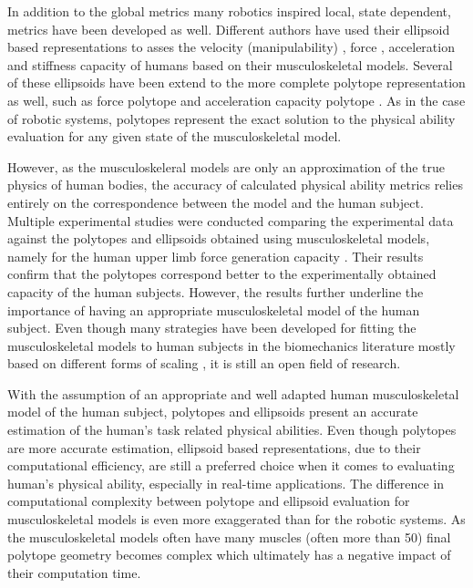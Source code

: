 In addition to the global metrics many robotics inspired local, state dependent, metrics have been developed as well. Different authors have used their ellipsoid based representations to asses the velocity (manipulability) \cite{Rezzoug2012manipulability}, force \cite{rezzoug_application_2012, lazinica_higher_2010}, acceleration \cite{khatib2009robotics} and stiffness \cite{Artemiadis2010} capacity of humans based on their musculoskeletal models. Several of these ellipsoids have been extend to the more complete polytope representation as well, such as force polytope \cite{lazinica_higher_2010, rezzoug_application_2012, carmichael_estimating_2013} and acceleration capacity polytope \cite{khatib2009robotics, demircan2012muscle}. As in the case of robotic systems, polytopes represent the exact solution to the physical ability evaluation for any given state of the musculoskeletal model. 

However, as the musculoskeleral models are only an approximation of the true physics of human bodies, the accuracy of calculated physical ability metrics relies entirely on the correspondence between the model and the human subject. Multiple experimental studies were conducted comparing the experimental data against the polytopes and ellipsoids obtained using musculoskeletal models, namely for the human upper limb force generation capacity \cite{biomechanics1010008, HERNANDEZ2015,lazinica_higher_2010}. Their results confirm that the polytopes correspond better to the experimentally obtained capacity of the human subjects. However, the results further underline the importance of having an appropriate musculoskeletal model of the human subject. Even though many strategies have been developed for fitting the musculoskeletal models to human subjects in the biomechanics literature mostly based on different forms of scaling \cite{Lund2015, Ziyun2019}, it is still an open field of research. 

With the assumption of an appropriate and well adapted human musculoskeletal model of the human subject, polytopes and ellipsoids present an accurate estimation of the human's task related physical abilities. 
Even though polytopes are more accurate estimation, ellipsoid based representations, due to their computational efficiency, are still a preferred choice when it comes to evaluating human's physical ability, especially in real-time applications. The difference in computational complexity between polytope and ellipsoid evaluation for musculoskeletal models is even more exaggerated than for the robotic systems. As the musculoskeletal models often have many muscles (often more than 50) final polytope geometry becomes complex which ultimately has a negative impact of their computation time.

